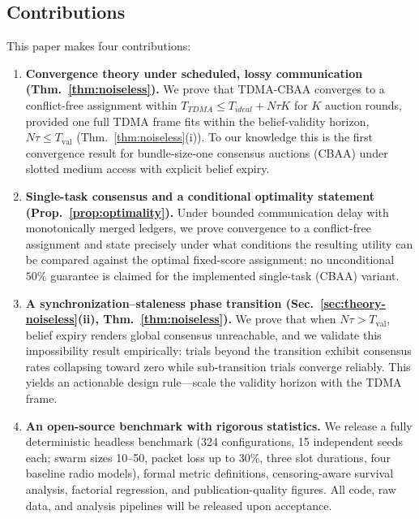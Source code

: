 \subsection{Contributions}
This paper makes four contributions:
\begin{enumerate}
    \item \textbf{Convergence theory under scheduled, lossy communication (Thm.~\ref{thm:noiseless}).}
    We prove that TDMA-CBAA converges to a conflict-free assignment within
    $T_{TDMA} \leq T_{ideal} + N\tau K$
    for $K$ auction rounds, provided one full TDMA frame fits within the belief-validity horizon, $N\tau \leq T_{\mathrm{val}}$ (Thm.~\ref{thm:noiseless}(i)).
    To our knowledge this is the first convergence result for bundle-size-one consensus auctions (CBAA) under slotted medium access with explicit belief expiry.
    \item \textbf{Single-task consensus and a conditional optimality statement (Prop.~\ref{prop:optimality}).}
    Under bounded communication delay with monotonically merged ledgers, we prove convergence to a conflict-free assignment and state precisely under what conditions the resulting utility can be compared against the optimal fixed-score assignment; no unconditional $50\%$ guarantee is claimed for the implemented single-task (CBAA) variant.
    \item \textbf{A synchronization--staleness phase transition (Sec.~\ref{sec:theory-noiseless}(ii), Thm.~\ref{thm:noiseless}).}
    We prove that when $N\tau > T_{\mathrm{val}}$, belief expiry renders global consensus unreachable, and we validate this impossibility result empirically: trials beyond the transition exhibit consensus rates collapsing toward zero while sub-transition trials converge reliably.
    This yields an actionable design rule---scale the validity horizon with the TDMA frame.
    \item \textbf{An open-source benchmark with rigorous statistics.}
    We release a fully deterministic headless benchmark (324 configurations, 15 independent seeds each; swarm sizes 10--50, packet loss up to 30\%, three slot durations, four baseline radio models), formal metric definitions, censoring-aware survival analysis, factorial regression, and publication-quality figures.
    All code, raw data, and analysis pipelines will be released upon acceptance.
\end{enumerate}